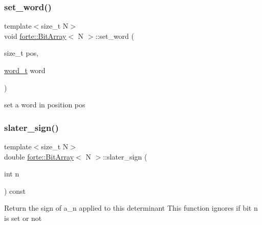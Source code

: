 \subsubsection{\texorpdfstring{set\+\_\+word()}{set\_word()}}
{\footnotesize\ttfamily template$<$size\+\_\+t N$>$ \\
void \mbox{\hyperlink{classforte_1_1_bit_array}{forte\+::\+Bit\+Array}}$<$ N $>$\+::set\+\_\+word (\begin{DoxyParamCaption}\item[{size\+\_\+t}]{pos,  }\item[{\mbox{\hyperlink{classforte_1_1_bit_array_a7f3b4ebbbe4bc80ce60cc6614cb565da}{word\+\_\+t}}}]{word }\end{DoxyParamCaption})\hspace{0.3cm}{\ttfamily [inline]}}



set a word in position pos 

\mbox{\label{classforte_1_1_bit_array_ad41338929f4ddb1ddb5c4e783e593645}} 
\subsubsection{\texorpdfstring{slater\+\_\+sign()}{slater\_sign()}\hspace{0.1cm}{\footnotesize\ttfamily [1/2]}}
{\footnotesize\ttfamily template$<$size\+\_\+t N$>$ \\
double \mbox{\hyperlink{classforte_1_1_bit_array}{forte\+::\+Bit\+Array}}$<$ N $>$\+::slater\+\_\+sign (\begin{DoxyParamCaption}\item[{int}]{n }\end{DoxyParamCaption}) const\hspace{0.3cm}{\ttfamily [inline]}}

Return the sign of a\+\_\+n applied to this determinant This function ignores if bit n is set or not \mbox{\label{classforte_1_1_bit_array_ae622441da06a5612addf552aeab89040}} 
